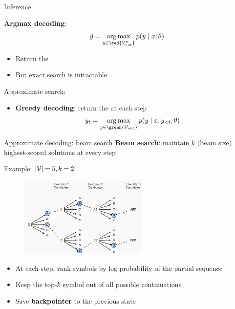 \documentclass[usenames,dvipsnames,notes,11pt,aspectratio=169,hyperref={colorlinks=true, linkcolor=blue}]{beamer}
\begin{document}
\begin{frame}
    {Inference}

    \textbf{Argmax decoding}: 
    $$
    \hat{y} = \argmax_{y\in\red{\sV_{\text{out}}^n}} p(y\mid x; \theta)
    $$
    \vspace{-1em}
    \begin{itemize}
        \item Return the 
        \item But exact search is intractable 
    \end{itemize}

    \pause
    Approximate search:\\
    \begin{itemize}
        \item \textbf{Greedy decoding}: return the  at each step
            $$
            y_t = \argmax_{y\in\green{\sV_{\text{out}}}} p(y\mid x, y_{<t}; \theta)
            $$
    \end{itemize}
\end{frame}

\begin{frame}
    {Approximate decoding: beam search}
    \textbf{Beam search}: maintain $k$ (beam size) highest-scored  solutions at every step 
    
    Example: $|\mathcal{V}|=5, k=2$
    \vspace{-1em}
    \begin{figure}
        \includegraphics[height=4cm]{figures/beam-search}
    \end{figure}
    \vspace{-1em}

    \begin{itemize}
        \item At each step, rank symbols by log probability of the partial sequence
        \item Keep the top-$k$ symbol out of all possible continuations
        \item Save \textbf{backpointer} to the previous state
    \end{itemize}
\end{frame}
\end{document}
